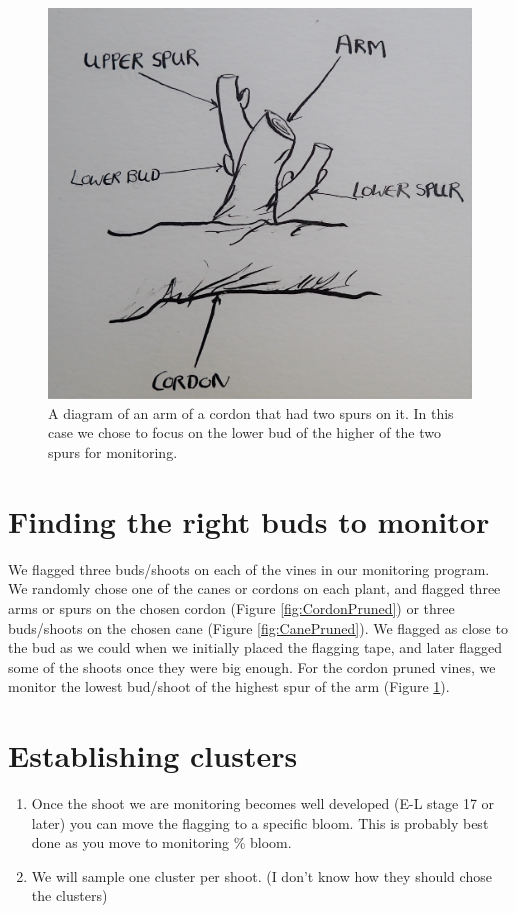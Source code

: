 \documentclass[11pt,letter]{article}
\begin{document}
\begin{figure}%
  \includegraphics[width=\linewidth]{TwoSpurs.jpg}
  \caption{A diagram of an arm of a cordon that had two spurs on it. In this case we chose to focus on the lower bud of the higher of the two spurs for monitoring. }
  \label{fig:TwoSpurs}
\end{figure}

\section{Finding the right buds to monitor}
We flagged three buds/shoots on each of the vines in our monitoring program. We randomly chose one of the canes or cordons on each plant, and flagged three arms or spurs on the chosen cordon (Figure \ref{fig:CordonPruned}) or three buds/shoots on the chosen cane (Figure \ref{fig:CanePruned}). We flagged as close to the bud as we could when we initially placed the flagging tape, and later flagged some of the shoots once they were big enough. For the cordon pruned vines, we monitor the lowest bud/shoot of the highest spur of the arm (Figure \ref{fig:TwoSpurs}). 

\section{Establishing clusters}
\begin{enumerate}
	\item Once the shoot we are monitoring becomes well developed (E-L stage 17 or later) you can move the flagging to a specific bloom. This is probably best done as you move to monitoring \% bloom. 
	\item We will sample one cluster per shoot. 
	(I don't know how they should chose the clusters)

\end{enumerate}
\end{document}
